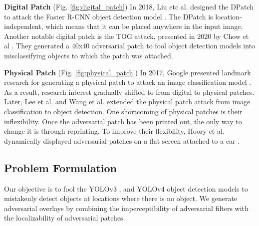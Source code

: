 \textbf{Digital Patch} (Fig. \ref{fig:digital_patch}) In 2018, Liu etc al. designed the DPatch \citep{liu2018dpatch} to attack the Faster R-CNN object detection model \citep{ren2015faster}. The DPatch is location-independent, which means that it can be placed anywhere in the input image. Another notable digital patch is the TOG attack, presented in 2020 by Chow et al \citep{chow2020adversarial}. They generated a 40x40 adversarial patch to fool object detection models into misclassifying objects to which the patch was attached.

\textbf{Physical Patch} (Fig. \ref{fig:physical_patch}) In 2017, Google presented landmark research for generating a physical patch to attack an image classification model \citep{brown2017patch}. As a result, research interest gradually shifted to from digital to physical patches. Later, Lee et al. \citep{lee2019physical} and Wang et al. \citep{wang2021daedalus} extended the physical patch attack from image classification to object detection. One shortcoming of physical patches is their inflexibility. Once the adversarial patch has been printed out, the only way to change it is through reprinting. To improve their flexibility, Hoory et al. dynamically displayed adversarial patches on a flat screen attached to a car \citep{hoory2020dynamic}.




\subsection{Problem Formulation} 

Our objective is to fool the YOLOv3 \cite{redmon2018yolov3}, and YOLOv4 \cite{bochkovskiy2020yolov4} object detection models to mistakenly detect objects at locations where there is no object. We generate adversarial overlays by combining the imperceptibility of adversarial filters with the localizability of adversarial patches.

